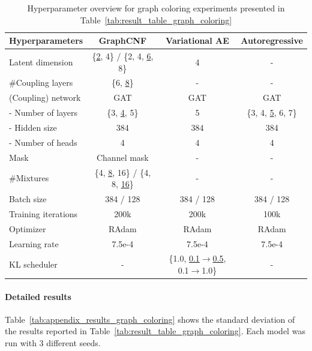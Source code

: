 \begin{table}[ht!]
    \centering
    \caption[Hyperparameter overview for the graph coloring experiments]{Hyperparameter overview for graph coloring experiments presented in Table~\ref{tab:result_table_graph_coloring}}
    \label{tab:appendix_hyperparameters_graph_coloring}
    \renewcommand{\arraystretch}{1.2}
    \begin{tabular}{lccc}
        \toprule
        \textbf{Hyperparameters} & \textbf{GraphCNF} & \textbf{Variational AE} & \textbf{Autoregressive}\\
        \midrule
        Latent dimension & \{\underline{2}, 4\} / \{2, 4, \underline{6}, 8\} & 4 & -\\
        \#Coupling layers & \{6, \underline{8}\} & - & - \\
        (Coupling) network & GAT & GAT & GAT \\
        - Number of layers & \{3, \underline{4}, 5\} & 5 & \{3, 4, \underline{5}, 6, 7\} \\
        - Hidden size & 384 & 384 & 384 \\
        - Number of heads & 4 & 4 & 4 \\
        Mask & Channel mask & - & -\\
        \#Mixtures & \{4, \underline{8}, 16\} / \{4, 8, \underline{16}\} & - & - \\
        Batch size & 384 / 128 & 384 / 128 & 384 / 128\\
        Training iterations & 200k & 200k & 100k\\
        Optimizer & RAdam & RAdam & RAdam \\
        Learning rate & 7.5e-4 & 7.5e-4 & 7.5e-4 \\
        KL scheduler & - & \{1.0, \underline{0.1$\to$0.5}, 0.1$\to$1.0\} & - \\
        \bottomrule
    \end{tabular}
\end{table}

\paragraph{Detailed results}
Table~\ref{tab:appendix_results_graph_coloring} shows the standard deviation of the results reported in Table~\ref{tab:result_table_graph_coloring}. 
Each model was run with 3 different seeds.

